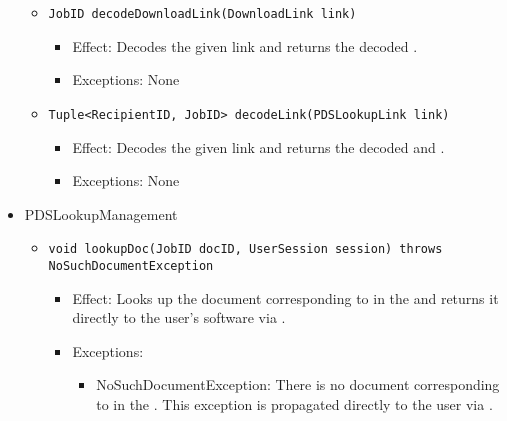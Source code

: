 \begin{itemize}
\begin{itemize}
        \item \texttt{JobID decodeDownloadLink(DownloadLink link)}
		    \begin{itemize}
                \item Effect: Decodes the given link and returns the decoded .
                \item Exceptions: None
            \end{itemize}

		\item \texttt{Tuple<RecipientID, JobID> decodeLink(PDSLookupLink link)}
		    \begin{itemize}
                \item Effect: Decodes the given link and returns the decoded  and .
                \item Exceptions: None
            \end{itemize}
    \end{itemize}

	\item PDSLookupManagement
    \begin{itemize}
        \item \texttt{void lookupDoc(JobID docID, UserSession session) throws NoSuchDocumentException}
        \begin{itemize}
            \item Effect: Looks up the document corresponding to  in the  and returns it directly to the user's software via .
            \item Exceptions: 
			\begin{itemize}
				\item NoSuchDocumentException: There is no document corresponding to  in the . This exception is propagated directly to the user via .
			\end{itemize}
        \end{itemize}


\end{itemize}
\end{itemize}
